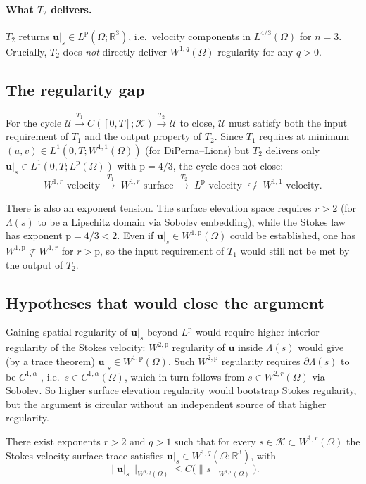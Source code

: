 \documentclass[hidelinks,onefignum,onetabnum,final]{siamart220329}  %
\newcommand{\RR}{\mathbb{R}}
\newcommand{\bu}{\mathbf{u}}
\newcommand{\cK}{\mathcal{K}}
\newcommand{\cU}{\mathcal{U}}
\newcommand{\pp}{\mathrm{p}}
\begin{document}
\paragraph{What $T_2$ delivers.}
$T_2$ returns $\bu|_s \in L^{\pp}(\Omega;\RR^3)$, i.e.~velocity
components in $L^{4/3}(\Omega)$ for $n=3$.
Crucially, $T_2$ does \emph{not} directly deliver $W^{1,q}(\Omega)$
regularity for any $q > 0$.

\subsection{The regularity gap}

For the cycle
$\cU \xrightarrow{T_1} C([0,T];\cK) \xrightarrow{T_2} \cU$
to close, $\cU$ must satisfy both the input requirement of $T_1$
and the output property of $T_2$.  Since $T_1$ requires at minimum
$(u,v)\in L^1(0,T;W^{1,1}(\Omega))$ (for DiPerna--Lions) but
$T_2$ delivers only $\bu|_s \in L^1(0,T;L^{\pp}(\Omega))$
with $\pp=4/3$, the cycle does not close:
\[
W^{1,r}\text{ velocity} \;\xrightarrow{T_1}\; W^{1,r}\text{ surface}
\;\xrightarrow{T_2}\; L^{\pp}\text{ velocity}
\;\not\hookrightarrow\; W^{1,1}\text{ velocity}.
\]

There is also an exponent tension.  The surface elevation space requires
$r > 2$ (for $\Lambda(s)$ to be a Lipschitz domain via Sobolev
embedding), while the Stokes law has exponent $\pp = 4/3 < 2$.
Even if $\bu|_s \in W^{1,\pp}(\Omega)$ could be established, one has
$W^{1,\pp} \not\subset W^{1,r}$ for $r > \pp$, so the input
requirement of $T_1$ would still not be met by the output of $T_2$.

\subsection{Hypotheses that would close the argument}

Gaining spatial regularity of $\bu|_s$ beyond $L^{\pp}$ would
require higher interior regularity of the Stokes velocity:
$W^{2,\pp}$ regularity of $\bu$ inside $\Lambda(s)$ would give
(by a trace theorem) $\bu|_s \in W^{1,\pp}(\Omega)$.
Such $W^{2,\pp}$ regularity requires $\partial\Lambda(s)$ to be
$C^{1,\alpha}$ \cite{JouvetRappaz2011}, i.e.~$s\in C^{1,\alpha}(\Omega)$,
which in turn follows from $s\in W^{2,r}(\Omega)$ via Sobolev.
So higher surface elevation regularity would bootstrap Stokes
regularity, but the argument is circular without an independent
source of that higher regularity.

\begin{hypothesis}
\label{hyp:stokestraceW1}
There exist exponents $r>2$ and $q>1$ such that for every
$s\in\cK \subset W^{1,r}(\Omega)$ the Stokes velocity surface trace
satisfies $\bu|_s \in W^{1,q}(\Omega;\RR^3)$, with
\begin{equation}
\|\bu|_s\|_{W^{1,q}(\Omega)} \le C\bigl(\|s\|_{W^{1,r}(\Omega)}\bigr).
\label{eq:app:hyp1}
\end{equation}
\end{hypothesis}
\end{document}
